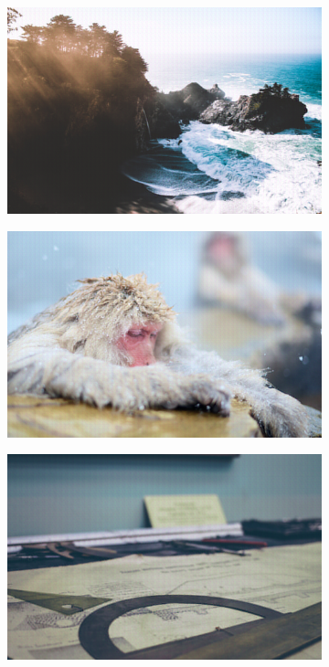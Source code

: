 \documentclass{article}
\begin{document}
\begin{figure}
    \centering
    \begin{subfigure}[b]{0.7 \textwidth}
    \includegraphics[width=\textwidth]{Images/autoencoder/reconstructed/512_256_128/test1_80_relu.png}
    \end{subfigure}
    \begin{subfigure}[b]{0.7 \textwidth}
    \includegraphics[width=\textwidth]{Images/autoencoder/reconstructed/512_256_128/test2_80_relu.png}
    \end{subfigure}
    \begin{subfigure}[b]{0.7 \textwidth}
    \includegraphics[width=\textwidth]{Images/autoencoder/reconstructed/512_256_128/test3_80_relu.png}

\end{subfigure}
\end{figure}
\end{document}
